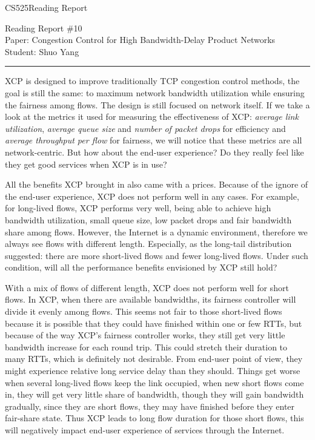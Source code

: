 \documentclass[11pt]{article}
\def\CourseCode{CS525}
\def\ReportNo{10}
\def\Category{Reading Report}
\def\PaperTitle{Congestion Control for High Bandwidth-Delay Product
  Networks}
\def\Author{Shuo Yang}
\begin{document}
\noindent

\CourseCode \hfill \Category

\begin{center}
Reading Report \#\ReportNo\\
Paper: \PaperTitle\\
Student: \Author\\
\end{center}

\hrule\smallskip
\vspace{1.5em}

XCP is designed to improve traditionally TCP congestion control
methods, the goal is still the same: to maximum network bandwidth
utilization while ensuring the fairness among flows. The design is
still focused on network itself. If we take a look at the metrics it
used for measuring the effectiveness of XCP: \emph{average link
  utilization}, \emph{average queue size} and \emph{number of packet
  drops} for efficiency and \emph{average throughput per flow} for
fairness, we will notice that these metrics are all
network-centric. But how about the end-user experience? Do they really
feel like they get good services when XCP is in use?

\vspace{1em}
All the benefits XCP brought in also came with a prices. Because of
the ignore of the end-user experience, XCP does not perform well in
any cases. For example, for long-lived flows, XCP performs very well,
being able to achieve high bandwidth utilization, small queue size,
low packet drops and fair bandwidth share among flows. However, the
Internet is a dynamic environment, therefore we always see flows with
different length. Especially, as the long-tail distribution suggested:
there are more short-lived flows and fewer long-lived flows. Under
such condition, will all the performance benefits envisioned by XCP
still hold? 

\vspace{1em}
With a mix of flows of different length, XCP does not perform
well for short flows. In XCP, when there are available bandwidths,
its fairness controller will divide it evenly among flows. This seems
not fair to those short-lived flows because it is possible that they
could have finished within one or few RTTs, but because of the way
XCP's fairness controller works, they still get very little bandwidth
increase for each round trip. This could stretch their duration to
many RTTs, which is definitely not desirable. From end-user point of
view, they might experience relative long service delay than they
should. Things get worse when several long-lived flows keep the
link occupied, when new short flows come in, they will get very little
share of bandwidth, though they will gain bandwidth gradually, since
they are short flows, they may have finished before they enter
fair-share state. Thus XCP leads to long flow duration for those short
flows, this will negatively impact end-user experience of
services through the Internet.
\end{document}
